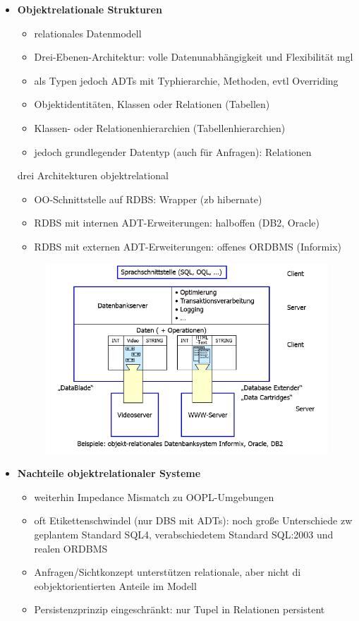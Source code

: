 \begin{itemize}
	\item \textbf{Objektrelationale Strukturen}
	\begin{itemize}
		\item relationales Datenmodell
		\item Drei-Ebenen-Architektur: volle Datenunabhängigkeit und Flexibilität mgl
		\item als Typen jedoch ADTs mit Typhierarchie, Methoden, evtl Overriding
		\item Objektidentitäten, Klassen oder Relationen (Tabellen)
		\item Klassen- oder Relationenhierarchien (Tabellenhierarchien)
		\item jedoch grundlegender Datentyp (auch für Anfragen): Relationen
	\end{itemize}
	
	drei Architekturen objektrelational
	\begin{itemize}
		\item OO-Schnittstelle auf RDBS: Wrapper (zb hibernate)
		\item RDBS mit internen ADT-Erweiterungen: halboffen (DB2, Oracle)
		\item RDBS mit externen ADT-Erweiterungen: offenes ORDBMS (Informix)
	\end{itemize}
	
	\begin{figure}[!h]
		\centering
		\includegraphics[scale=0.6]{img/open_ordbms.png}
	\end{figure}
	
	\item \textbf{Nachteile objektrelationaler Systeme}
	\begin{itemize}
		\item weiterhin Impedance Mismatch zu OOPL-Umgebungen
		\item oft Etikettenschwindel (nur DBS mit ADTs): noch große Unterschiede zw geplantem Standard SQL4, verabschiedetem Standard SQL:2003 und realen ORDBMS
		\item Anfragen/Sichtkonzept unterstützen relationale, aber nicht di eobjektorientierten Anteile im Modell
		\item Persistenzprinzip eingeschränkt: nur Tupel in Relationen persistent
	\end{itemize}
	

\end{itemize}
